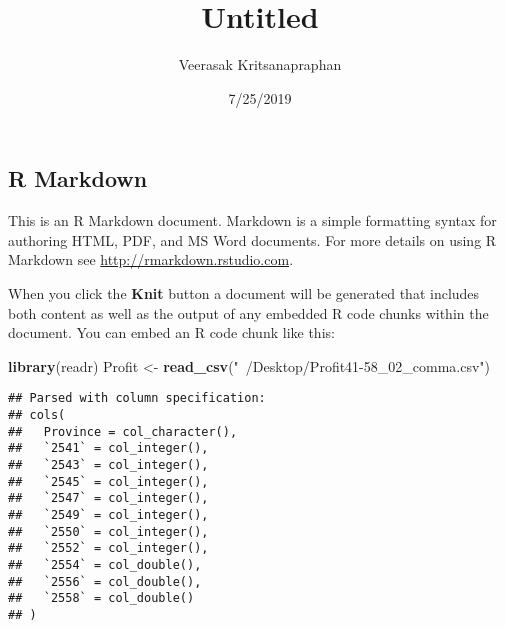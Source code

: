\documentclass[]{article}
\title{Untitled}
\author{Veerasak Kritsanapraphan}
\date{7/25/2019}
\newenvironment{Shaded}{\begin{snugshade}}{\end{snugshade}}
\newcommand{\KeywordTok}[1]{\textcolor[rgb]{0.13,0.29,0.53}{\textbf{#1}}}
\newcommand{\NormalTok}[1]{#1}
\newcommand{\OperatorTok}[1]{\textcolor[rgb]{0.81,0.36,0.00}{\textbf{#1}}}
\newcommand{\StringTok}[1]{\textcolor[rgb]{0.31,0.60,0.02}{#1}}
\begin{document}
\maketitle

\hypertarget{r-markdown}{%
\subsection{R Markdown}\label{r-markdown}}

This is an R Markdown document. Markdown is a simple formatting syntax
for authoring HTML, PDF, and MS Word documents. For more details on
using R Markdown see \url{http://rmarkdown.rstudio.com}.

When you click the \textbf{Knit} button a document will be generated
that includes both content as well as the output of any embedded R code
chunks within the document. You can embed an R code chunk like this:

\begin{Shaded}
\begin{Highlighting}[]
\KeywordTok{library}\NormalTok{(readr)}
\NormalTok{Profit <-}\StringTok{ }\KeywordTok{read_csv}\NormalTok{(}\StringTok{"~/Desktop/Profit41-58_02_comma.csv"}\NormalTok{)}
\end{Highlighting}
\end{Shaded}

\begin{verbatim}
## Parsed with column specification:
## cols(
##   Province = col_character(),
##   `2541` = col_integer(),
##   `2543` = col_integer(),
##   `2545` = col_integer(),
##   `2547` = col_integer(),
##   `2549` = col_integer(),
##   `2550` = col_integer(),
##   `2552` = col_integer(),
##   `2554` = col_double(),
##   `2556` = col_double(),
##   `2558` = col_double()
## )
\end{verbatim}

\begin{Shaded}
\end{Shaded}
\end{document}
